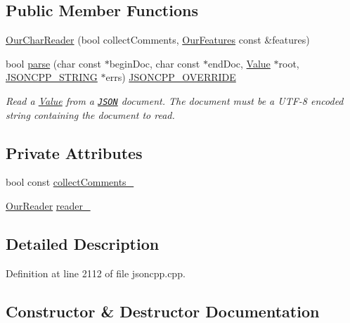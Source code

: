 \subsection*{Public Member Functions}
\begin{DoxyCompactItemize}
\item 
\hyperlink{class_json_1_1_our_char_reader_a5015506620e7ba7bab417756fa1ca9fe}{Our\+Char\+Reader} (bool collect\+Comments, \hyperlink{class_json_1_1_our_features}{Our\+Features} const \&features)
\item 
bool \hyperlink{class_json_1_1_our_char_reader_a547f08ec5a9951ca69e8bb2e90296c83}{parse} (char const $\ast$begin\+Doc, char const $\ast$end\+Doc, \hyperlink{class_json_1_1_value}{Value} $\ast$root, \hyperlink{json_8h_a1e723f95759de062585bc4a8fd3fa4be}{J\+S\+O\+N\+C\+P\+P\+\_\+\+S\+T\+R\+I\+NG} $\ast$errs) \hyperlink{json_8h_a824d6199c91488107e443226fa6022c5}{J\+S\+O\+N\+C\+P\+P\+\_\+\+O\+V\+E\+R\+R\+I\+DE}
\begin{DoxyCompactList}\small\item\em Read a \hyperlink{class_json_1_1_value}{Value} from a \href{http://www.json.org}{\tt J\+S\+ON} document. The document must be a U\+T\+F-\/8 encoded string containing the document to read. \end{DoxyCompactList}\end{DoxyCompactItemize}
\subsection*{Private Attributes}
\begin{DoxyCompactItemize}
\item 
bool const \hyperlink{class_json_1_1_our_char_reader_aa6afd3d0f754cadad0f6d2be38bcfee0}{collect\+Comments\+\_\+}
\item 
\hyperlink{class_json_1_1_our_reader}{Our\+Reader} \hyperlink{class_json_1_1_our_char_reader_aedd4520b8570654ed7aa0726075ee58d}{reader\+\_\+}
\end{DoxyCompactItemize}


\subsection{Detailed Description}


Definition at line 2112 of file jsoncpp.\+cpp.



\subsection{Constructor \& Destructor Documentation}
\mbox{\label{class_json_1_1_our_char_reader_a5015506620e7ba7bab417756fa1ca9fe}} 
